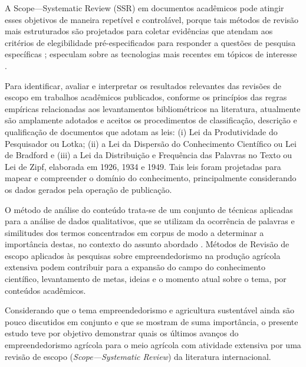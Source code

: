 A  Scope—Systematic Review (SSR) em documentos acadêmicos pode atingir esses objetivos de maneira repetível e controlável, porque tais métodos de revisão mais estruturados são projetados para coletar evidências que atendam aos critérios de elegibilidade pré-especificados para responder a questões de pesquisa específicas \cite{Chandler2021}; especulam sobre as tecnologias mais recentes em tópicos de interesse \cite{Keele2007,Medeiros2015}.

Para identificar, avaliar e interpretar os resultados relevantes das revisões de escopo em trabalhos acadêmicos publicados, conforme os princípios das regras empíricas relacionadas aos levantamentos bibliométricos na literatura, atualmente são amplamente adotados e aceitos os procedimentos de classificação, descrição e qualificação de documentos que adotam as leis: (i) Lei da Produtividade do Pesquisador ou Lotka; (ii) a Lei da Dispersão do Conhecimento Científico ou Lei de Bradford e (iii) a Lei da Distribuição e Frequência das Palavras no Texto ou Lei de Zipf, elaborada em 1926, 1934 e 1949. Tais leis foram projetadas para mapear e compreender o domínio do conhecimento, principalmente considerando os dados gerados pela operação de publicação.

O método de análise do conteúdo trata-se de um conjunto de técnicas aplicadas para a análise de dados qualitativos, que se utilizam da ocorrência de palavras e similitudes dos termos concentrados em corpus de modo a determinar a importância destas, no contexto do assunto abordado \cite{Cassettari2015}. Métodos de Revisão de escopo aplicados às pesquisas sobre empreendedorismo na produção agrícola extensiva podem contribuir para a expansão do campo do conhecimento científico, levantamento de metas, ideias e o momento atual sobre o tema, por conteúdos acadêmicos.

Considerando que o tema empreendedorismo e agricultura sustentável ainda são pouco discutidos em conjunto e que se mostram de suma importância, o presente estudo teve por objetivo demonstrar quais os últimos avanços do empreendedorismo agrícola para o meio agrícola com atividade extensiva por uma revisão de escopo (\textit{Scope—Systematic Review}) da literatura internacional.

